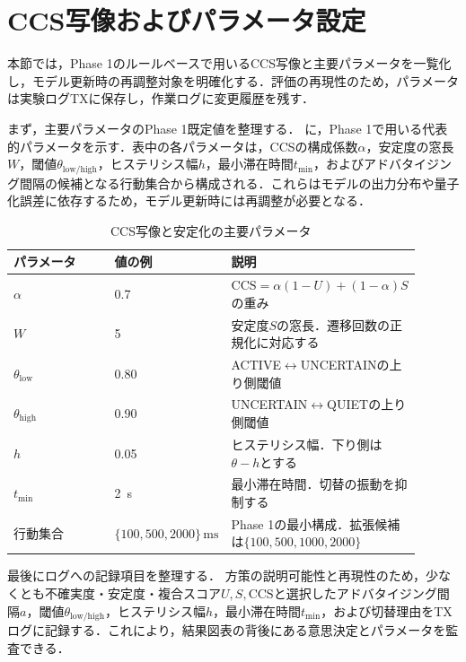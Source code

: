 ﻿%
\section{CCS写像およびパラメータ設定}
\label{sec:ccs_params}

本節では，Phase 1のルールベースで用いるCCS写像と主要パラメータを一覧化し，モデル更新時の再調整対象を明確化する．評価の再現性のため，パラメータは実験ログTXに保存し，作業ログに変更履歴を残す．

まず，主要パラメータのPhase 1既定値を整理する．
に，Phase 1で用いる代表的パラメータを示す．表中の各パラメータは，CCSの構成係数$\alpha$，安定度の窓長$W$，閾値$\theta_{\mathrm{low/high}}$，ヒステリシス幅$h$，最小滞在時間$t_{\min}$，およびアドバタイジング間隔の候補となる行動集合から構成される．これらはモデルの出力分布や量子化誤差に依存するため，モデル更新時には再調整が必要となる．

\begin{table}[tb]
  \centering
  \caption{CCS写像と安定化の主要パラメータ}
  \label{tab:ccs_params_phase1}
  \begin{tabular}{p{0.28\linewidth}p{0.18\linewidth}p{0.44\linewidth}}
    \toprule
    パラメータ & 値の例 & 説明 \\
    \midrule
    $\alpha$ & 0.7 & $\mathrm{CCS}=\alpha(1-U)+(1-\alpha)S$ の重み \\
    $W$ & 5 & 安定度$S$の窓長．遷移回数の正規化に対応する \\
    $\theta_{\mathrm{low}}$ & 0.80 & ACTIVE$\leftrightarrow$UNCERTAINの上り側閾値 \\
    $\theta_{\mathrm{high}}$ & 0.90 & UNCERTAIN$\leftrightarrow$QUIETの上り側閾値 \\
    $h$ & 0.05 & ヒステリシス幅．下り側は$\theta-h$とする \\
    $t_{\min}$ & \SI{2}{\second} & 最小滞在時間．切替の振動を抑制する \\
    行動集合 & $\{100,\allowbreak 500,\allowbreak 2000\}\,\si{\milli\second}$ & Phase 1の最小構成．拡張候補は$\{100,\allowbreak 500,\allowbreak 1000,\allowbreak 2000\}$ \\
    \bottomrule
  \end{tabular}
\end{table}

最後にログへの記録項目を整理する．
方策の説明可能性と再現性のため，少なくとも不確実度・安定度・複合スコア$U,S,\mathrm{CCS}$と選択したアドバタイジング間隔$a$，閾値$\theta_{\mathrm{low/high}}$，ヒステリシス幅$h$，最小滞在時間$t_{\min}$，および切替理由\texttt{}をTXログに記録する．これにより，結果図表の背後にある意思決定とパラメータを監査できる．


